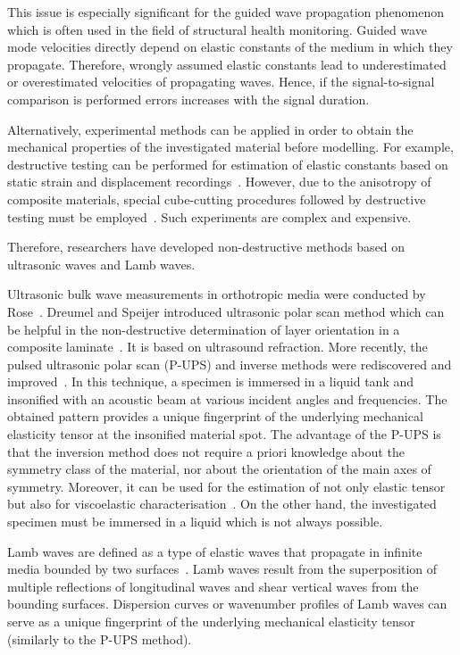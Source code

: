 \documentclass[preprint,12pt]{elsarticle}
\begin{document}
This issue is especially significant for the guided wave propagation phenomenon which is often used in the field of structural health monitoring. 
Guided wave mode velocities directly depend on elastic constants of the medium in which they propagate.
Therefore, wrongly assumed elastic constants lead to underestimated or overestimated velocities of propagating waves. 
Hence, if the signal-to-signal comparison is performed errors increases with the signal duration.

Alternatively, experimental methods can be applied in order to obtain the mechanical properties of the investigated material before modelling. 
For example, destructive testing can be performed for estimation of elastic constants based on static strain and displacement recordings~\cite{Wang2000,Petersen2016}.
However, due to the anisotropy of composite materials, special cube-cutting procedures followed by destructive testing must be employed~\cite{Rose1991}.
Such experiments are complex and expensive.

Therefore, researchers have developed non-destructive methods based on ultrasonic waves and Lamb waves.

Ultrasonic bulk wave measurements in orthotropic media were conducted by Rose~\cite{Rose1999}.
Dreumel and Speijer introduced ultrasonic polar scan method which can be helpful in the non-destructive determination of layer orientation in a composite laminate~\cite{VanDreumel1982}. 
It is based on ultrasound refraction.
More recently, the pulsed ultrasonic polar scan (P-UPS) and inverse methods were rediscovered and improved~\cite{Kersemans2014,Martens2017}. 
In this technique, a specimen is immersed in a liquid tank and insonified with an acoustic beam at various incident angles and frequencies. 
The obtained pattern provides a unique fingerprint of the underlying mechanical elasticity tensor at the insonified material spot.
The advantage of the P-UPS is that the inversion method does not require a priori knowledge about the symmetry class of the material, nor about the orientation of the main axes of symmetry.
Moreover, it can be used for the estimation of not only elastic tensor but also for viscoelastic characterisation~\cite{Martens2019}.	
On the other hand, the investigated specimen must be immersed in a liquid which is not always possible.

Lamb waves are defined as a type of elastic waves that propagate in infinite media bounded by two surfaces~\cite{Rose1999}. 
Lamb waves result from the superposition of multiple reflections of longitudinal waves and shear vertical waves from the bounding surfaces.
Dispersion curves or wavenumber profiles of Lamb waves can serve as a unique fingerprint of the underlying mechanical elasticity tensor (similarly to the P-UPS method).
\end{document}
